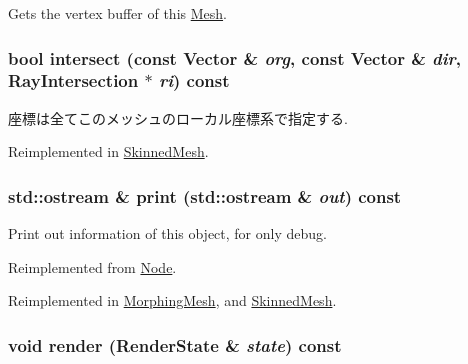 Gets the vertex buffer of this \hyperlink{classm3g_1_1Mesh}{Mesh}. \hypertarget{classm3g_1_1Mesh_dc812d8230f94f0b6b8e4fecdb802a16}{
\subsubsection[{intersect}]{\setlength{\rightskip}{0pt plus 5cm}bool intersect (const {\bf Vector} \& {\em org}, \/  const {\bf Vector} \& {\em dir}, \/  {\bf RayIntersection} $\ast$ {\em ri}) const}}
\label{classm3g_1_1Mesh_dc812d8230f94f0b6b8e4fecdb802a16}


座標は全てこのメッシュのローカル座標系で指定する. 

Reimplemented in \hyperlink{classm3g_1_1SkinnedMesh_dc812d8230f94f0b6b8e4fecdb802a16}{SkinnedMesh}.\hypertarget{classm3g_1_1Mesh_6fea17fa1532df3794f8cb39cb4f911f}{
\subsubsection[{print}]{\setlength{\rightskip}{0pt plus 5cm}std::ostream \& print (std::ostream \& {\em out}) const}}
\label{classm3g_1_1Mesh_6fea17fa1532df3794f8cb39cb4f911f}


Print out information of this object, for only debug. 

Reimplemented from \hyperlink{classm3g_1_1Node_6fea17fa1532df3794f8cb39cb4f911f}{Node}.

Reimplemented in \hyperlink{classm3g_1_1MorphingMesh_6fea17fa1532df3794f8cb39cb4f911f}{MorphingMesh}, and \hyperlink{classm3g_1_1SkinnedMesh_6fea17fa1532df3794f8cb39cb4f911f}{SkinnedMesh}.\hypertarget{classm3g_1_1Mesh_8babc8a79b78615da51161e94029eea9}{
\subsubsection[{render}]{\setlength{\rightskip}{0pt plus 5cm}void render ({\bf RenderState} \& {\em state}) const}}
\label{classm3g_1_1Mesh_8babc8a79b78615da51161e94029eea9}


